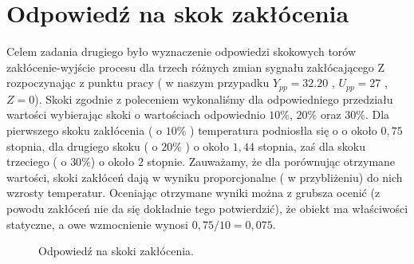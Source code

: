 \chapter{Odpowiedź na skok zakłócenia}
Celem zadania drugiego było wyznaczenie odpowiedzi skokowych torów zakłócenie-wyjście
procesu dla trzech różnych zmian sygnału zakłócającego Z rozpoczynając z punktu pracy
( w naszym przypadku $Y_{pp} = 32.20$ , $U_{pp} = 27$ , $Z = 0$). Skoki zgodnie z
poleceniem wykonaliśmy dla odpowiedniego przedziału wartości wybierając skoki o
wartościach odpowiednio $10\%$, $20\%$ oraz $30\%$. Dla pierwszego skoku
zakłócenia ( o $10\%$ ) temperatura podniosłla się o o około $0,75$ stopnia,
dla drugiego skoku ( o $20\%$ ) o około $1,44$ stopnia, zaś dla skoku trzeciego
( o $30\%$) o około $2$ stopnie. Zauważamy, że dla porównując otrzymane
wartości, skoki zakłóceń dają  w wyniku proporcjonalne ( w przybliżeniu)
do nich wzrosty temperatur. Oceniając otrzymane wyniki można z grubsza ocenić
(z powodu zakłóceń nie da się dokładnie tego potwierdzić), że obiekt ma
właściwości statyczne, a owe wzmocnienie wynosi $0,75/10 = 0,075$.

\begin{figure}[tb]
\centering
{}
\caption{Odpowiedź na skoki zakłócenia.}
\label{fig:skok_zak}
\end{figure}
